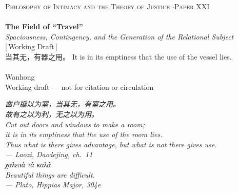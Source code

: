 \documentclass[11pt,a4paper]{article}
\newcommand{\zh}[1]{{\cjk #1}}
\newcommand{\el}[1]{{\grk #1}}
\begin{document}
\thispagestyle{empty}
\begin{center}
\vspace*{2cm}
{\footnotesize\color{rosedeep}\scshape Philosophy of Intimacy and the Theory of Justice \quad$\cdot$\quad Paper XXI}\\[0.3cm]
\coverrule\\[1.2cm]
{\LARGE\bfseries\color{warnred} The Field of ``Travel''}\\[0.5cm]
{\large\itshape\color{warnred} Spaciousness, Contingency, and the Generation of the Relational Subject}\\[0.8cm]
{\small\color{gold} [\,Working Draft\,]}\\[0.8cm]
{\normalsize\color{inksoft} \zh{当其无，有器之用。} It is in its emptiness that the use of the vessel lies.}\\[2cm]
\coverrule[0.25]\\[0.6cm]
{\normalsize\color{inksoft} Wanhong}\\
\vfill
{\footnotesize\color{gold} Working draft --- not for citation or circulation}
\coverfootnote
\end{center}
\newpage

\thispagestyle{empty}
\vspace*{2.2cm}
\begin{center}
\begin{minipage}{0.78\linewidth}
\centering\itshape\color{rose}
\zh{凿户牖以为室，当其无，有室之用。}\\[0.2em]
\zh{故有之以为利，无之以为用。}\\[0.3em]
Cut out doors and windows to make a room;\\[0.1em]
it is in its emptiness that the use of the room lies.\\[0.1em]
Thus what is there gives advantage, but what is not there gives use.\\[0.6em]
{\upshape\footnotesize\color{gold} --- Laozi, \emph{Daodejing}, ch.~11}\\[1.4em]
\itshape
\el{χαλεπὰ τὰ καλά.}\\[0.2em]
Beautiful things are difficult.\\[0.6em]
{\upshape\footnotesize\color{gold} --- Plato, \emph{Hippias Major}, 304e}
\end{minipage}
\end{center}
\newpage
\end{document}
